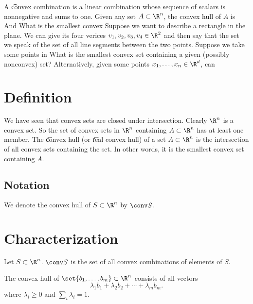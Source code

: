 A \t{convex combination} is a linear combination whose sequence of scalars is nonnegative and sums to one.
Given any set $A \subset \R ^n$, the convex hull of $A$ is
And
What is the smallest convex
Suppose we want to describe a rectangle in the plane.
We can give its four verices $v_1, v_2, v_3, v_4 \in \R ^2$ and then say that the set we speak of the set of all line
segments between the two points.
Suppose we take some points in
What is the smallest convex set containing a given (possibly nonconvex) set?
Alternatively, given some points $x_1, \dots , x_n \in \R ^d$, can
        \section*{Definition}

We have seen that convex sets are closed under intersection.
Clearly $\R ^n$ is a convex set.
So the set of convex sets in $\R ^n$ containing $A \subset \R ^n$ has at least one member.
The \t{convex hull} (or \t{real convex hull}) of a set $A \subset \R ^n$ is the intersection of all convex sets containing the set.
In other words, it is the smallest convex set containing $A$.

        \subsection*{Notation}

We denote the convex hull of $S \subset \R ^n$ by $\conv S$.

        \section*{Characterization}

\begin{proposition}
Let $S \subset \R ^n$. $\conv S$ is the set of all convex combinations of elements of $S$.
\end{proposition}

\begin{proposition}
The convex hull of $\set{b_1, \dots , b_m} \subset \R ^n$ consists of all vectors
\[
\lambda _1b_1 + \lambda _2b_2 + \cdots + \lambda _mb_m.
\]
where $\lambda _i \geq 0$ and $\sum_{i}\lambda _i = 1$.
\end{proposition}

\blankpage


